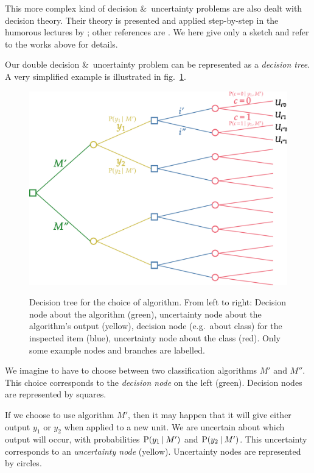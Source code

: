 \documentclass[\ifafour a4paper,12pt,\else a5paper,10pt,\fi%
onecolumn,oneside,article,%
british%
]{memoir}
\theoremstyle{remark}
\theoremstyle{innote}
\newcommand*{\amp}{\&}
\renewcommand*{\P}{\mathrm{P}}%
\renewcommand*{\|}[1][]{\nonscript\:#1\vert\nonscript\:\mathopen{}}
\newcommand*{\sect}{\S}%
\newcommand*{\chap}{ch.}%
\newcommand*{\fig}{fig.}%
\newcommand*{\eg}{{e.g.}}
\begin{document}
This more complex kind of decision \amp\ uncertainty problems are also dealt with decision theory. Their theory is presented  and applied step-by-step in the humorous lectures by \cites[\chap~2]{raiffa1968_r1970}; other references are  \autocites[\sect~2.2]{bernardoetal1994_r2000}{prattetal1995_r1996,raiffaetal1961_r2000,luceetal1957}. We here give only a sketch and refer to the works above for details.

Our double decision \amp\ uncertainty problem can be represented as a \emph{decision tree}. A very simplified example is illustrated in \fig~\ref{fig:decision_tree}.
\begin{figure}[!t]
  \centering
  \includegraphics[width=\linewidth]{decision_tree_algorithm.pdf}\\
  \caption{Decision tree for the choice of algorithm. From left to right: Decision node about the algorithm (green), uncertainty node about the algorithm's output (yellow), decision node (\eg\ about class) for the inspected item (blue), uncertainty node about the class (red). Only some example nodes and branches are labelled.}
  \label{fig:decision_tree}
\end{figure}

We imagine to have to choose between two classification algorithms $M'$ and $M''$. This choice corresponds to the \emph{decision node} on the left (green). Decision nodes are represented by squares.

If we choose to use algorithm $M'$, then it may happen that it will give either output $y_{1}$ or $y_{2}$ when applied to a new unit. We are uncertain about which output will occur, with probabilities $\P(y_{1} \| M')$ and $\P(y_{2} \| M')$. This uncertainty corresponds to an \emph{uncertainty node} (yellow). Uncertainty nodes are represented by circles.
\end{document}
